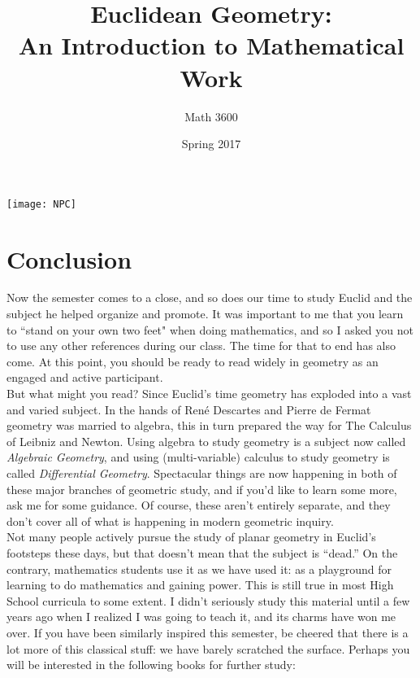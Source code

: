 \documentclass{tufte-handout}
\title{Euclidean Geometry:\\An Introduction to Mathematical Work}
\author[Math 3600]{Math 3600}
\date{Spring 2017}
\theoremstyle{definition}
\begin{document}
\maketitle

\begin{marginfigure}
    \texttt{[image: NPC]}
\end{marginfigure}

\section*{Conclusion}


Now the semester comes to a close, and so does our time to study Euclid and the subject he helped organize and promote. It was important to me that you learn to ``stand on your own two feet" when doing mathematics, and so I asked you not to use any other references during our class. The time for that to end has also come. At this point, you should be ready to read widely in geometry as an engaged and active participant.\\

But what might you read? Since Euclid's time geometry has exploded into a vast and varied subject. 
In the hands of Ren\'{e} Descartes and Pierre de Fermat geometry was married to algebra, this in turn prepared the way for The Calculus of Leibniz and Newton. 
Using algebra to study geometry is a subject now called \emph{Algebraic Geometry}, and using (multi-variable) calculus to study geometry is called \emph{Differential Geometry}.  Spectacular things are now happening in both of these major branches of geometric study, and if you'd like to learn some more, ask me for some guidance. 
Of course, these aren't entirely separate, and they don't cover all of what is happening in modern geometric inquiry.\\

Not many people actively pursue the study of planar geometry in Euclid's footsteps these days, but that doesn't mean that the subject is ``dead.'' On the contrary, mathematics students use it as we have used it: as a playground for learning to do mathematics and gaining power. This is still true in most High School curricula to some extent. I didn't seriously study this material until a few years ago when I realized I was going to teach it, and its charms have won me over. If you have been similarly inspired this semester, be cheered that there is a lot more of this classical stuff: we have barely scratched the surface. Perhaps you will be interested in the following books for further study:
\end{document}

